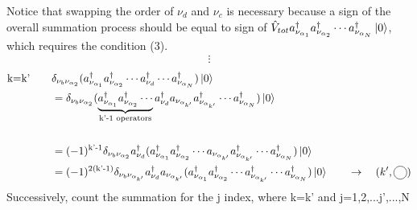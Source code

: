 \documentclass{article}
\newcommand\encircle[1]{%
    \tikz[baseline=(X.base)] 
      \node (X) [draw, shape=circle, inner sep=0] {\strut #1};}
\begin{document}
Notice that swapping the order of $\nu_d$ and $\nu_c$ is necessary because a sign of the overall summation process should be equal to 
sign of $\hat{V}_{tot} a^{\dagger}_{\nu_{\alpha_1}}a^{\dagger}_{\nu_{\alpha_2}}\cdots a^{\dagger}_{\nu_{\alpha_N}}\ket{0}$, which requires the condition (3).
\begin{align*}
    \vdots
\end{align*}
\begin{align*}
    \text{k=k'} \qquad &\delta_{\nu_b \nu_{\alpha_2}} (a^{\dagger}_{\nu_{\alpha_1}} a^{\dagger}_{\nu_{\alpha_2}} \cdots a^{\dagger}_{\nu_d} \cdots a^{\dagger}_{\nu_{\alpha_N}})\ket{0}\\
    & =\delta_{\nu_b \nu_{\alpha_2}} (\underbrace{a^{\dagger}_{\nu_{\alpha_1}} a^{\dagger}_{\nu_{\alpha_2}} \cdots }_{\text{k'-1 operators}}a^{\dagger}_{\nu_d} a_{\nu_{\alpha_{k'}}} a^{\dagger}_{\nu_{\alpha_{k'}}}  \cdots a^{\dagger}_{\nu_{\alpha_N}})\ket{0}\\
    &\\
    & =(-1)^{\text{k'-1}}\delta_{\nu_b \nu_{\alpha_2}} a^{\dagger}_{\nu_d} (a^{\dagger}_{\nu_{\alpha_1}} a^{\dagger}_{\nu_{\alpha_2}} \cdots a_{\nu_{\alpha_{k'}}} a^{\dagger}_{\nu_{\alpha_{k'}}}  \cdots a^{\dagger}_{\nu_{\alpha_N}})\ket{0}\\
    & =(-1)^{2( \text{k'-1})}\delta_{\nu_b \nu_{\alpha_{k'}}} a^{\dagger}_{\nu_d} a_{\nu_{\alpha_{k'}}} (a^{\dagger}_{\nu_{\alpha_1}} a^{\dagger}_{\nu_{\alpha_2}} \cdots a^{\dagger}_{\nu_{\alpha_{k'}}}  \cdots a^{\dagger}_{\nu_{\alpha_N}})\ket{0} \qquad \rightarrow \quad (k',\encircle{})
\end{align*}
Successively, count the summation for the j index, where k=k' and j=1,2,...j',...,N
\end{document}
